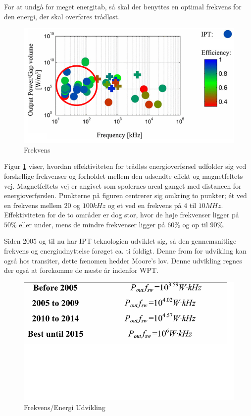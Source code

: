 For at undgå for meget energitab, så skal der benyttes en optimal frekvens for den energi, der skal overføres trådløst.

\begin{figure}[H]
\centering
\includegraphics[scale=0.5]{Vildledning/Schematics/Power_vs_frekvens.png}
\caption{Frekvens \cite{limit}}
\label{frekvens}
\end{figure}

Figur \ref{frekvens} viser, hvordan effektiviteten for trådløs energioverførsel udfolder sig ved forskellige frekvenser og forholdet mellem den udsendte effekt og magnetfeltets vej. Magnetfeltets vej er angivet som spolernes areal ganget med distancen for energioverførslen. Punkterne på figuren centrerer sig omkring to punkter; ét ved en frekvens mellem $20$ og $100kHz$ og et ved en frekvens på $4$ til $10MHz$. Effektiviteten for de to områder er dog stor, hvor de høje frekvenser ligger på $50\%$ eller under, mens de mindre frekvenser ligger på $60\%$ og op til $90\%$.

Siden 2005 og til nu har IPT teknologien udviklet sig, så den gennemsnitlige frekvens og energiudnyttelse forøget ca. ti foldigt. Denne from for udvikling kan også hos transiter, dette fænomen hedder Moore's lov. Denne udvikling regnes der også at forekomme de næste år indenfor WPT. 

\begin{figure}[H]
\centering
\includegraphics[scale=0.5]{Vildledning/Schematics/frekvens_energi}
\caption{Frekvens/Energi Udvikling \cite{limit}}
\end{figure}

